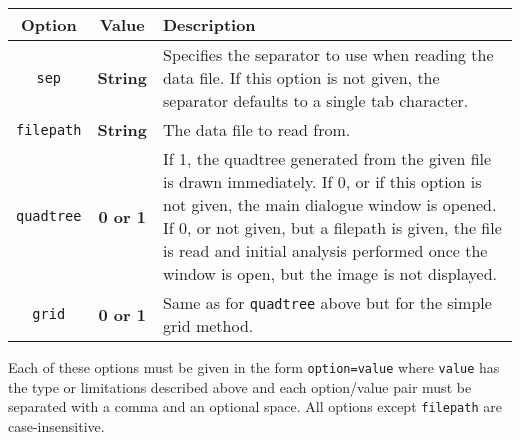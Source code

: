 \tabulinesep=1.2mm
\begin{tabu}{c c X}
	\toprule
	Option & Value & Description \\
	\midrule
	\texttt{sep} & \textbf{String} & Specifies the separator to use when
		reading the data file. If this option is not given, the separator
		defaults to a single tab character. \\
	\texttt{filepath} & \textbf{String} & The data file to read from. \\
	\texttt{quadtree} & \textbf{0 or 1} & If 1, the quadtree generated from
		the given file is drawn immediately. If 0, or if this option is not
		given, the main dialogue window is opened. If 0, or not given, but a
		filepath is given, the file is read and initial analysis performed once
		the window is open, but the image is not displayed. \\
	\texttt{grid} & \textbf{0 or 1} & Same as for \texttt{quadtree} above
		but for the simple grid method. \\
	\bottomrule
\end{tabu}

Each of these options must be given in the form \texttt{option=value} where
\texttt{value} has the type or limitations described above and each
option/value pair must be separated with a comma and an optional space. All
options except \texttt{filepath} are case-insensitive.
